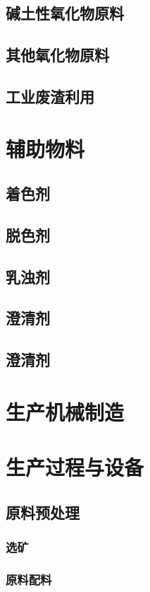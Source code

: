 \documentclass[UTF8]{../../ApplicationUniverse}
\begin{document}
    \subsection{碱土性氧化物原料}
    \subsection{其他氧化物原料}
    \subsection{工业废渣利用}
\section{辅助物料}
    \subsection{着色剂}
    \subsection{脱色剂}
    \subsection{乳浊剂}
    \subsection{澄清剂}
    \subsection{澄清剂}
\section{生产机械制造}
\section{生产过程与设备}
    \subsection{原料预处理}
        \subsubsection{选矿}
        \subsubsection{原料配料}
\end{document}
